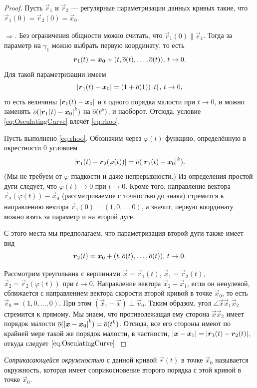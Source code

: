 \begin{proof}
	Пусть $\vec{r}_1$ и $\vec{r}_2$ --- регулярные параметризации данных кривых такие, что $\vec{r}_1(0) = \vec{r}_2(0) = \vec{x}_0$.

	$\Rightarrow$. Без ограничения общности можно считать, что $\dot{\vec{r}}_1(0) \parallel \vec{e}_1$. Тогда за параметр на $\gamma_1$ можно выбрать первую координату, то есть
	\[
		\boldsymbol{r}_1(t) = \boldsymbol{x_0} + (t, \overline{o}(t), \ldots, \overline{o}(t)),\,t \to 0.
	\]
	Для такой параметризации имеем
	\[
		\left\lvert\boldsymbol{r}_1(t) - \boldsymbol{x}_0\right\rvert = (1 + \overline{o}(1))\left\lvert t\right\rvert,\,t \to 0,
	\]
	то есть величины $\left\lvert\boldsymbol{r}_1(t) - \boldsymbol{x}_0\right\rvert$ и $t$ одного порядка малости при $t \to 0$, и можно заменять $\overline{o}(\left\lvert\boldsymbol{r}_1(t) - \boldsymbol{x}_0\right\rvert^k)$ на $\overline{o}(t^k)$, и наоборот. Отсюда, условие \eqref{eq:OsculatingCurve} влечёт \eqref{eq:rhoo}.

	Пусть выполнено \eqref{eq:rhoo}. Обозначим через $\varphi(t)$ функцию, определённую в окрестности $0$ условием
	\[
		\left\lvert\boldsymbol{r}_1(t) - \boldsymbol{r}_2(\varphi(t))\right\rvert = \overline{o}(\left\lvert\boldsymbol{r}_1(t) - \boldsymbol{x}_0\right\rvert^k).
	\]
	(Мы не требуем от $\varphi$ гладкости и даже непрерывности.) Из определения простой дуги следует, что $\varphi(t) \to 0$ при $t \to 0$. Кроме того, направление вектора $\vec{r}_2(\varphi(t)) - \vec{x}_0$ (рассматриваемое с точностью до знака) стремится к направлению вектора $\dot{\vec{r}}_1(0) = (1, 0, \ldots, 0)$, а значит, первую координату можно взять за параметр и на второй дуге.

	С этого места мы предполагаем, что параметризация второй дуги также имеет вид
	\[
		\boldsymbol{r}_2(t) = \boldsymbol{x}_0 + (t, \overline{o}(t), \ldots, \overline{o}(t)),\,t \to 0.
	\]

	Рассмотрим треугольник с вершинами $\vec{x} = \vec{r}_1(t)$, $\vec{x}_1 = \vec{r}_2(t)$, $\vec{x}_2 = \vec{r}_2(\varphi(t))$ при $t \to 0$. Направление вектора $\vec{x}_2 - \vec{x}_1$, если он ненулевой, сближается с направлением вектора скорости второй кривой в точке $\vec{x}_0$, то есть $\vec{v}_0 = (1, 0, \ldots, 0)$. При этом $(\vec{x}_1 - \vec{x}) \perp \vec{v}_0$. Таким образом, угол $\angle \vec{x}\vec{x}_1\vec{x}_2$ стремится к прямому. Мы знаем, что противолежащая ему сторона $\vec{x}\vec{x}_2$ имеет порядок малости $\overline{o}(\left\lvert\boldsymbol{x} - \boldsymbol{x}_0\right\rvert^k) = \overline{o}(t^k)$. Отсюда, все его стороны имеют по крайней мере такой же порядок малости, в частности, $\left\lvert\boldsymbol{x} - \boldsymbol{x}_1\right\rvert = \left\lvert\boldsymbol{r}_1(t) - \boldsymbol{r}_2(t)\right\rvert$, откуда следует $\eqref{eq:OsculatingCurve}$.
\end{proof}

\begin{definition}
	\textit{Соприкасающейся окружностью} с данной кривой $\vec{r}(t)$ в точке $\vec{x}_0$ называется окружность, которая имеет соприкосновение второго порядка с этой кривой в точке $\vec{x}_0$.
\end{definition}

